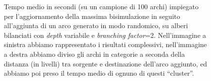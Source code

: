 \begin{figure}[b!]
\begin{subfigure}[t]{0.48\textwidth}
    \end{subfigure}
    \caption{Tempo medio in secondi (su un campione di 100 archi) impiegato per l'aggiornamento della massima bisimulazione in seguito all'aggiunta di un arco generato in modo randomico, su alberi bilanciati con \emph{depth} variabile e \emph{branching factor}=2. Nell'immagine a sinistra abbiamo rappresentato i risultati complessivi, nell'immagine a destra abbiamo diviso gli archi in categorie a seconda della distanza (in livelli) tra sorgente e destinazione dell'arco aggiunto, ed abbiamo poi preso il tempo medio di ognuno di questi ``cluster''.}
    \label{fig:saha_results_tree}
\end{figure}

